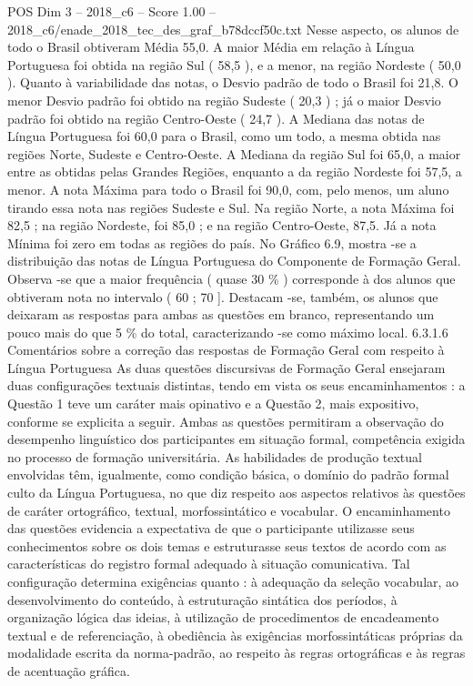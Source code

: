 \begin{textsample}{POS Dim 3 – 2018\_c6 – Score 1.00 – 2018\_c6/enade\_2018\_tec\_des\_graf\_b78dccf50c.txt}
Nesse aspecto, os alunos de todo o Brasil obtiveram Média 55,0.
A maior Média em relação à Língua Portuguesa foi obtida na região Sul ( 58,5 ), e a menor, na região Nordeste ( 50,0 ).
Quanto à variabilidade das notas, o Desvio padrão de todo o Brasil foi 21,8.
O menor Desvio padrão foi obtido na região Sudeste ( 20,3 ) ; já o maior Desvio padrão foi obtido na região Centro-Oeste ( 24,7 ).
A Mediana das notas de Língua Portuguesa foi 60,0 para o Brasil, como um todo, a mesma obtida nas regiões Norte, Sudeste e Centro-Oeste.
A Mediana da região Sul foi 65,0, a maior entre as obtidas pelas Grandes Regiões, enquanto a da região Nordeste foi 57,5, a menor.
A nota Máxima para todo o Brasil foi 90,0, com, pelo menos, um aluno tirando essa nota nas regiões Sudeste e Sul.
Na região Norte, a nota Máxima foi 82,5 ; na região Nordeste, foi 85,0 ; e na região Centro-Oeste, 87,5.
Já a nota Mínima foi zero em todas as regiões do país.
No Gráfico 6.9, mostra -se a distribuição das notas de Língua Portuguesa do Componente de Formação Geral.
Observa -se que a maior frequência ( quase 30 \% ) corresponde à dos alunos que obtiveram nota no intervalo ( 60 ; 70 ].
Destacam -se, também, os alunos que deixaram as respostas para ambas as questões em branco, representando um pouco mais do que 5 \% do total, caracterizando -se como máximo local. 6.3.1.6 Comentários sobre a correção das respostas de Formação Geral com respeito à Língua Portuguesa As duas questões discursivas de Formação Geral ensejaram duas configurações textuais distintas, tendo em vista os seus encaminhamentos : a Questão 1 teve um caráter mais opinativo e a Questão 2, mais expositivo, conforme se explicita a seguir.
Ambas as questões permitiram a observação do desempenho linguístico dos participantes em situação formal, competência exigida no processo de formação universitária.
As habilidades de produção textual envolvidas têm, igualmente, como condição básica, o domínio do padrão formal culto da Língua Portuguesa, no que diz respeito aos aspectos relativos às questões de caráter ortográfico, textual, morfossintático e vocabular.
O encaminhamento das questões evidencia a expectativa de que o participante utilizasse seus conhecimentos sobre os dois temas e estruturasse seus textos de acordo com as características do registro formal adequado à situação comunicativa.
Tal configuração determina exigências quanto : à adequação da seleção vocabular, ao desenvolvimento do conteúdo, à estruturação sintática dos períodos, à organização lógica das ideias, à utilização de procedimentos de encadeamento textual e de referenciação, à obediência às exigências morfossintáticas próprias da modalidade escrita da norma-padrão, ao respeito às regras ortográficas e às regras de acentuação gráfica.

\end{textsample}
